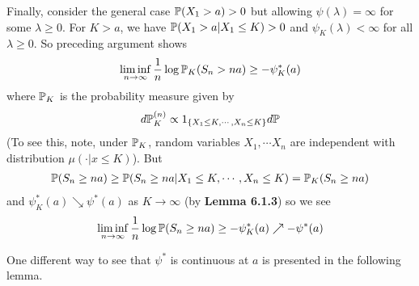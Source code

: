 \documentclass[10pt,a4paper]{report}
\newenvironment{proof}
{\begin{changemargin}{1cm}{0.5cm} 
	}%
	{\end{changemargin}
}
\begin{document}
\begin{proof}
\quad Finally, consider the general case $\mathbb{P}(X_1 >a) >0$ but allowing $\psi(\lambda) = \infty$ for some $\lambda \geq 0$. For $K>a$, we have $\mathbb{P}(X_1 >a | X_1 \leq K) >0$ and $\psi_K(\lambda) < \infty$ for all $\lambda \geq 0$. So preceding argument shows
\begin{align*}
\liminf_{n\rightarrow \infty} \frac{1}{n} \log \mathbb{P}_K (S_n > na) \geq -\psi_K^* (a)
\end{align*}
where $\mathbb{P}_K$ is the probability measure given by
\begin{align*}
d\mathbb{P}^{(n)}_K \propto 1_{ \{ X_1 \leq K, \cdots, X_n \leq K \}} d\mathbb{P}
\end{align*}
(To see this, note, under $\mathbb{P}_K$, random variables $X_1, \cdots X_n$ are independent with distribution $\mu(\cdot | x\leq K)$). But
\begin{align*}
\mathbb{P}(S_n \geq na) \geq \mathbb{P}(S_n \geq na | X_1\leq K, \cdots, X_n \leq K)  = \mathbb{P}_K(S_n \geq na)
\end{align*}
and $\psi^*_K(a) \searrow \psi^*(a)$ as $K\rightarrow \infty$ (by \textbf{Lemma 6.1.3}) so we see
\begin{align*}
\liminf_{n\rightarrow \infty} \frac{1}{n} \log \mathbb{P}(S_n \geq na) \geq -\psi^*_K(a) \nearrow -\psi^*(a)
\end{align*}

\eop
\end{proof}
\s

One different way to see that $\psi^*$ is continuous at $a$ is presented in the following lemma.
\s
\end{document}
